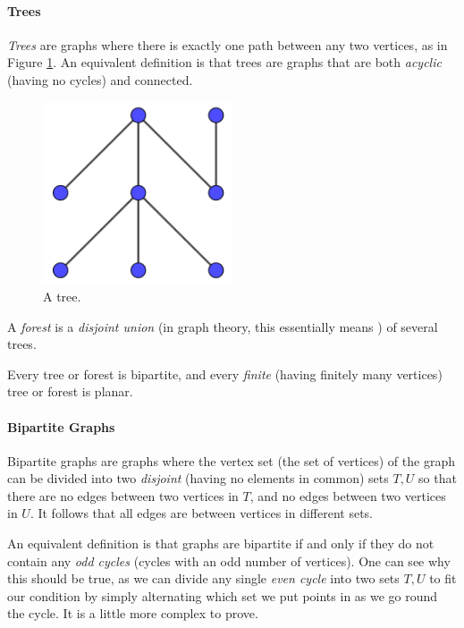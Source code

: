 \documentclass{article}
\begin{document}
	\paragraph{Trees}
	
	\textit{Trees} are graphs where there is exactly one path between any two vertices, as in Figure \ref{treegraph}. An equivalent definition is that trees are graphs that are both \textit{acyclic} (having no cycles) and connected.
	
	\begin{figure}[h]
		\centering
		\includegraphics[width=0.5\textwidth]{treegraph}
		\caption{A tree.}
		\label{treegraph}
	\end{figure}
	
	A \textit{forest} is a \textit{disjoint union} (in graph theory, this essentially means ) of several trees.
	
	Every tree or forest is bipartite\footnotemark[\ref{definedlater}], and every \textit{finite} (having finitely many vertices) tree or forest is planar\footnotemark[\ref{definedlater}].
	
	\paragraph{Bipartite Graphs}
	
	Bipartite graphs are graphs where the vertex set (the set of vertices) of the graph can be divided into two \textit{disjoint} (having no elements in common) sets \(T,U\) so that there are no edges between two vertices in \(T\), and no edges between two vertices in \(U\). It follows that all edges are between vertices in different sets.
	
	An equivalent definition is that graphs are bipartite if and only if they do not contain any \textit{odd cycles} (cycles with an odd number of vertices). One can see why this should be true, as we can divide any single \textit{even cycle} into two sets \(T,U\) to fit our condition by simply alternating which set we put points in as we go round the cycle. It is a little more complex to prove.
	
\end{document}
